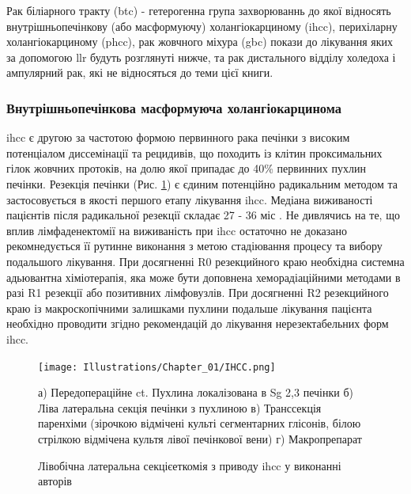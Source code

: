 Рак біліарного тракту (\acrshort{btc}) - гетерогенна група захворюваннь до якої відносять внутрішньопечінкову (або масформуючу) холангіокарциному (\acrshort{ihcc}), перихіларну холангіокарциному (\acrshort{phcc}), рак жовчного міхура (\acrshort{gbc}) покази до лікування яких за допомогою \acrshort{llr} будуть розглянуті нижче, та рак дистального відділу холедоха і ампулярний рак, які не відносяться до теми цієї книги. 

\subsubsection{Внутрішньопечінкова масформуюча холангіокарцинома}

\acrshort{ihcc} є другою за частотою формою первинного рака печінки з високим потенціалом диссемінації та рецидивів, що походить із клітин проксимальних гілок жовчних протоків, на долю якої припадає до 40\% первинних пухлин печінки. Резекція печінки (Рис. \ref{fig:IHCC}) є єдиним потенційно радикальним методом та застосовується в якості першого етапу лікування \acrshort{ihcc}. Медіана виживаності пацієнтів після радикальної резекції складає 27 - 36 міс \cite{Buettner2017}. Не дивлячись на те, що вплив лімфаденектомії на виживаність при \acrshort{ihcc} остаточно не доказано рекомнедується її рутинне виконання з метою стадіювання процесу та вибору подальшого лікування. При досягненні R0 резекцийного краю необхідна системна адьювантна хіміотерапія, яка може бути доповнена хеморадіаційними методами в разі R1 резекції або позитивних лімфовузлів. При досягненні R2 резекцийного краю із макроскопічними залишками пухлини подальше лікування пацієнта необхідно проводити згідно рекомендацій до лікування нерезектабельних форм \acrshort{ihcc}. 


\begin{figure}[h]
\caption{Лівобічна латеральна секцієеткомія з приводу \acrshort{ihcc} у виконанні авторів}


\texttt{[image: Illustrations/Chapter\_01/IHCC.png]}
\label{fig:IHCC}

\medskip
\small
а) Передопераційне \acrshort{ct}. Пухлина локалізована в Sg 2,3 печінки б) Ліва латеральна секція печінки з пухлиною  в) Транссекція паренхіми (зірочкою відмічені культі сегментарних глісонів, білою стрілкою відмічена культя лівої печінкової вени)  г) Макропрепарат 

\end{figure}

